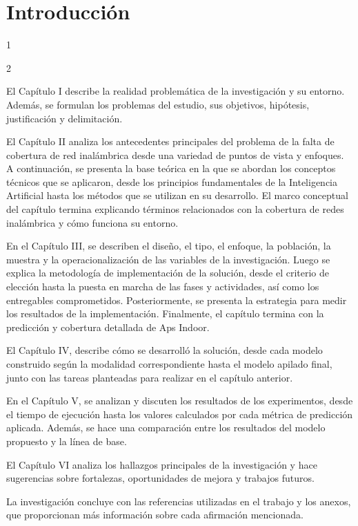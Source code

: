 
\chapter*{Introducción}

1

2

El Capítulo I describe la realidad problemática de la investigación y su entorno. Además, se formulan los problemas del estudio, sus objetivos, hipótesis, justificación y delimitación.


El Capítulo II analiza los antecedentes principales del problema de la falta de cobertura de red inalámbrica desde una variedad de puntos de vista y enfoques. A continuación, se presenta la base teórica en la que se abordan los conceptos técnicos que se aplicaron, desde los principios fundamentales de la Inteligencia Artificial hasta los métodos que se utilizan en su desarrollo. El marco conceptual del capítulo termina explicando términos relacionados con la cobertura de redes inalámbrica y cómo funciona su entorno.

En el Capítulo III, se describen el diseño, el tipo, el enfoque, la población, la muestra y la operacionalización de las variables de la investigación. Luego se explica la metodología de implementación de la solución, desde el criterio de elección hasta la puesta en marcha de las fases y actividades, así como los entregables comprometidos. Posteriormente, se presenta la estrategia para medir los resultados de la implementación. Finalmente, el capítulo termina con la predicción y cobertura detallada de Aps Indoor.

El Capítulo IV, describe cómo se desarrolló la solución, desde cada modelo construido según la modalidad correspondiente hasta el modelo apilado final, junto con las tareas planteadas para realizar en el capítulo anterior.

En el Capítulo V, se analizan y discuten los resultados de los experimentos, desde el tiempo de ejecución hasta los valores calculados por cada métrica de predicción aplicada. Además, se hace una comparación entre los resultados del modelo propuesto y la línea de base.

El Capítulo VI analiza los hallazgos principales de la investigación y hace sugerencias sobre fortalezas, oportunidades de mejora y trabajos futuros.

La investigación concluye con las referencias utilizadas en el trabajo y los anexos, que proporcionan más información sobre cada afirmación mencionada.